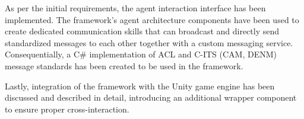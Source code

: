 \documentclass[0main.tex]{subfiles}
\begin{document}
As per the initial requirements, the agent interaction interface has been implemented. The framework's agent 
architecture components have been used to create dedicated communication skills that can broadcast and 
directly send standardized messages to each other together with a custom messaging service.
Consequentially, a C\# implementation of ACL and C-ITS (CAM, DENM) message standards has been created to
be used in the framework. 

Lastly, integration of the framework with the Unity game engine has been discussed and described in detail, 
introducing an additional wrapper component to ensure proper cross-interaction.

\clearpage
\end{document}
